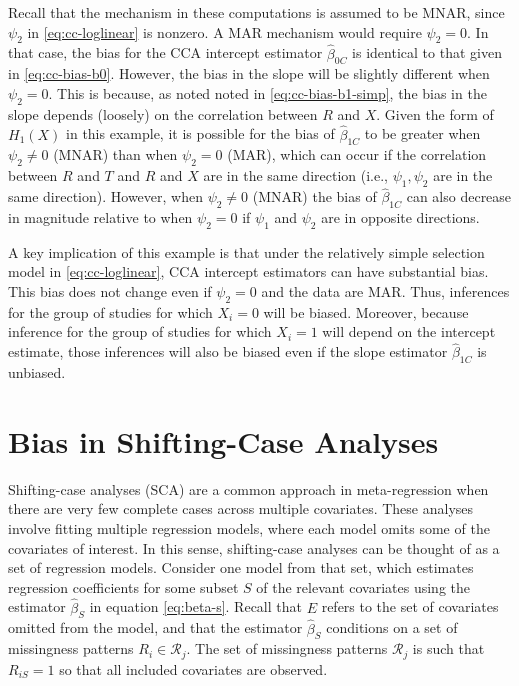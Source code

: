 \documentclass[
]{article}
\begin{document}
Recall that the mechanism in these computations is assumed to be MNAR, since \(\psi_2\) in \eqref{eq:cc-loglinear} is nonzero.
A MAR mechanism would require \(\psi_2 = 0\).
In that case, the bias for the CCA intercept estimator \(\hat{\beta}_{0C}\) is identical to that given in \eqref{eq:cc-bias-b0}.
However, the bias in the slope will be slightly different when \(\psi_2 = 0\).
This is because, as noted noted in \eqref{eq:cc-bias-b1-simp}, the bias in the slope depends (loosely) on the correlation between \(R\) and \(X\).
Given the form of \(H_1(X)\) in this example, it is possible for the bias of \(\hat{\beta}_{1C}\) to be greater when \(\psi_2 \neq 0\) (MNAR) than when \(\psi_2 = 0\) (MAR), which can occur if the correlation between \(R\) and \(T\) and \(R\) and \(X\) are in the same direction (i.e., \(\psi_1, \psi_2\) are in the same direction).
However, when \(\psi_2 \neq 0\) (MNAR) the bias of \(\hat{\beta}_{1C}\) can also decrease in magnitude relative to when \(\psi_2 = 0\) if \(\psi_1\) and \(\psi_2\) are in opposite directions.

A key implication of this example is that under the relatively simple selection model in \eqref{eq:cc-loglinear}, CCA intercept estimators can have substantial bias.
This bias does not change even if \(\psi_2 = 0\) and the data are MAR.
Thus, inferences for the group of studies for which \(X_i = 0\) will be biased.
Moreover, because inference for the group of studies for which \(X_i = 1\) will depend on the intercept estimate, those inferences will also be biased even if the slope estimator \(\hat{\beta}_{1C}\) is unbiased.

\hypertarget{bias-in-shifting-case-analyses}{%
\section{Bias in Shifting-Case Analyses}\label{bias-in-shifting-case-analyses}}

Shifting-case analyses (SCA) are a common approach in meta-regression when there are very few complete cases across multiple covariates.
These analyses involve fitting multiple regression models, where each model omits some of the covariates of interest.
In this sense, shifting-case analyses can be thought of as a set of regression models.
Consider one model from that set, which estimates regression coefficients for some subset \(S\) of the relevant covariates using the estimator \(\hat{\beta}_S\) in equation \eqref{eq:beta-s}.
Recall that \(E\) refers to the set of covariates omitted from the model, and that the estimator \(\hat{\beta}_S\) conditions on a set of missingness patterns \(R_i \in \mathcal{R}_j\).
The set of missingness patterns \(\mathcal{R}_j\) is such that \(R_{iS} = 1\) so that all included covariates are observed.
\end{document}
